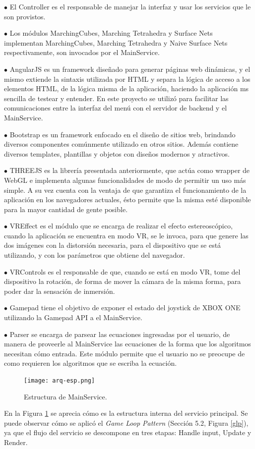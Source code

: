 \documentclass[12pt]{article}
\begin{document}
$\bullet$ El Controller es el responsable de manejar la interfaz y usar los servicios que le son provistos.

$\bullet$ Los módulos MarchingCubes, Marching Tetrahedra y Surface Nets implementan MarchingCubes, Marching Tetrahedra y Naive Surface Nets respectivamente, son invocados por el MainService.

$\bullet$ AngularJS es un framework diseñado para generar páginas web dinámicas, y el mismo extiende la sintaxis utilizada por HTML y separa la lógica de acceso a los elementos HTML, de la lógica misma de la aplicación, haciendo la aplicación ms sencilla de testear y entender. En este proyecto se utilizó para facilitar las comunicaciones entre la interfaz del menú con el servidor de backend y el MainService.

$\bullet$ Bootstrap es un framework enfocado en el diseño de sitios web, brindando diversos componentes comúnmente utilizado en otros sitios. Además contiene diversos templates, plantillas y objetos con diseños modernos y atractivos. 

$\bullet$ THREEJS es la librería presentada anteriormente, que actúa como wrapper de WebGL e implementa algunas funcionalidades de modo de permitir un uso más simple. A su vez cuenta con la ventaja de que garantiza el funcionamiento de la aplicación en los navegadores actuales, ésto permite que la misma esté disponible para la mayor cantidad de gente posible.

$\bullet$ VREffect es el módulo que se encarga de realizar el efecto estereoscópico, cuando la aplicación se encuentra en modo VR, se le invoca, para que genere las dos imágenes con la distorsión necesaria, para el dispositivo que se está utilizando, y con los parámetros que obtiene del navegador.

$\bullet$ VRControls es el responsable de que, cuando se está en modo VR, tome del dispositivo la rotación, de forma de mover la cámara de la misma forma, para poder dar la sensación de inmersión.

$\bullet$ Gamepad tiene el objetivo de exponer el estado del joystick de XBOX ONE utilizando la Gamepad API\cite{gamepadapi} a el MainService.

$\bullet$ Parser se encarga de parsear las ecuaciones ingresadas por el usuario, de manera de proveerle al MainService las ecuaciones de la forma que los algoritmos necesitan cómo entrada. Este módulo permite que el usuario no se preocupe de como requieren los algoritmos que se escriba la ecuación.
\begin{figure}[h!]
\texttt{[image: arq-esp.png]}
\caption{Estructura de MainService.}
\label{arqMS}
\end{figure}
En la Figura \ref{arqMS} se aprecia cómo es la estructura interna del servicio principal. Se puede observar cómo se aplicó el \textit{Game Loop Pattern} (Sección 5.2, Figura \ref{glp}), ya que el flujo del servicio se descompone en tres etapas: Handle input, Update y Render.
\end{document}
